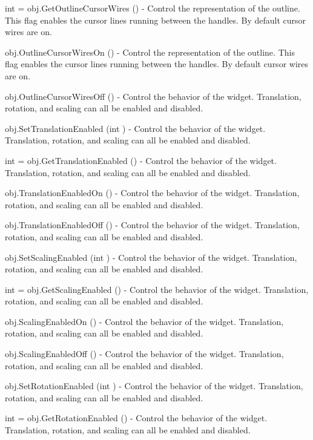 \begin{DoxyItemize}
\item {\ttfamily int = obj.\-Get\-Outline\-Cursor\-Wires ()} -\/ Control the representation of the outline. This flag enables the cursor lines running between the handles. By default cursor wires are on.  
\item {\ttfamily obj.\-Outline\-Cursor\-Wires\-On ()} -\/ Control the representation of the outline. This flag enables the cursor lines running between the handles. By default cursor wires are on.  
\item {\ttfamily obj.\-Outline\-Cursor\-Wires\-Off ()} -\/ Control the behavior of the widget. Translation, rotation, and scaling can all be enabled and disabled.  
\item {\ttfamily obj.\-Set\-Translation\-Enabled (int )} -\/ Control the behavior of the widget. Translation, rotation, and scaling can all be enabled and disabled.  
\item {\ttfamily int = obj.\-Get\-Translation\-Enabled ()} -\/ Control the behavior of the widget. Translation, rotation, and scaling can all be enabled and disabled.  
\item {\ttfamily obj.\-Translation\-Enabled\-On ()} -\/ Control the behavior of the widget. Translation, rotation, and scaling can all be enabled and disabled.  
\item {\ttfamily obj.\-Translation\-Enabled\-Off ()} -\/ Control the behavior of the widget. Translation, rotation, and scaling can all be enabled and disabled.  
\item {\ttfamily obj.\-Set\-Scaling\-Enabled (int )} -\/ Control the behavior of the widget. Translation, rotation, and scaling can all be enabled and disabled.  
\item {\ttfamily int = obj.\-Get\-Scaling\-Enabled ()} -\/ Control the behavior of the widget. Translation, rotation, and scaling can all be enabled and disabled.  
\item {\ttfamily obj.\-Scaling\-Enabled\-On ()} -\/ Control the behavior of the widget. Translation, rotation, and scaling can all be enabled and disabled.  
\item {\ttfamily obj.\-Scaling\-Enabled\-Off ()} -\/ Control the behavior of the widget. Translation, rotation, and scaling can all be enabled and disabled.  
\item {\ttfamily obj.\-Set\-Rotation\-Enabled (int )} -\/ Control the behavior of the widget. Translation, rotation, and scaling can all be enabled and disabled.  
\item {\ttfamily int = obj.\-Get\-Rotation\-Enabled ()} -\/ Control the behavior of the widget. Translation, rotation, and scaling can all be enabled and disabled.  

\end{DoxyItemize}
